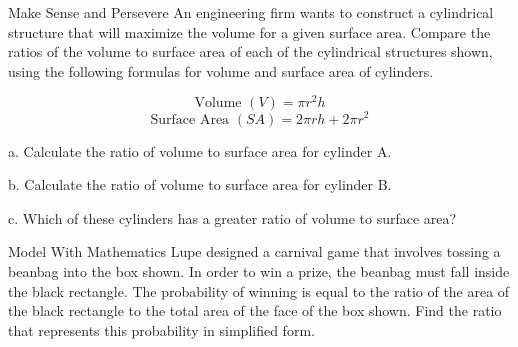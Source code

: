 \documentclass{article}
\newenvironment{practice}[2]{}{}        %
\newcommand{\answer}[1]{}               %
\newcommand{\placeholder}[2]{}          %
\begin{document}
\begin{practice}{35}{1}
Make Sense and Persevere An engineering firm wants to construct a cylindrical structure that will maximize the volume for a given surface area. Compare the ratios of the volume to surface area of each of the cylindrical structures shown, using the following formulas for volume and surface area of cylinders.

\[
\text{Volume }(V)=\pi r^2h
\]
\[
\text{Surface Area }(SA)=2\pi rh+2\pi r^2
\]


a. Calculate the ratio of volume to surface area for cylinder A.

b. Calculate the ratio of volume to surface area for cylinder B.

c. Which of these cylinders has a greater ratio of volume to surface area?

\answer{a. \(\frac{r}{3}\). b. \(\frac{3r}{8}\). c. cylinder B; \(\frac{3r}{8}>\frac{1}{3}r\).}
\end{practice}

\begin{practice}{36}{2}
Model With Mathematics Lupe designed a carnival game that involves tossing a beanbag into the box shown. In order to win a prize, the beanbag must fall inside the black rectangle. The probability of winning is equal to the ratio of the area of the black rectangle to the total area of the face of the box shown. Find the ratio that represents this probability in simplified form.

\placeholder{photo}{Carnival game with a child tossing a beanbag toward a rectangular box. The face of the box is labeled \(3x\) along the bottom and \(x+1\) along the side, with a black rectangular target labeled \(x\) by \(\frac{1}{2}x\).}


\answer{The probability is \(\frac{x}{6(x+1)}\).}
\end{practice}
\end{document}
